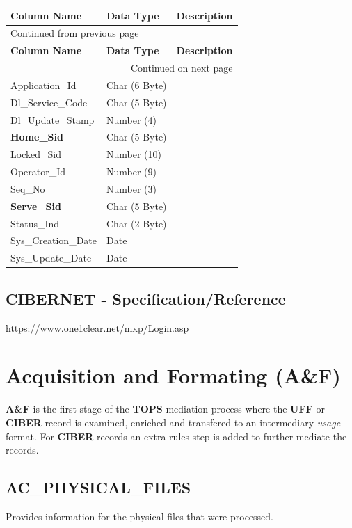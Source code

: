 \documentclass[12pt,twoside]{article}
\begin{document}
\footnotesize
\begin{longtable}{l|l|l}
\hline
\textbf{Column Name} & \textbf{Data Type} & \textbf{Description}\\
\hline
\endfirsthead
\multicolumn{3}{l}{Continued from previous page} \\
\hline

\textbf{Column Name} & \textbf{Data Type} & \textbf{Description} \\

\hline
\endhead
\hline\multicolumn{3}{r}{Continued on next page} \\
\endfoot
\endlastfoot
\hline
Application\_Id & Char (6 Byte) & \\
Dl\_Service\_Code & Char (5 Byte) & \\
Dl\_Update\_Stamp & Number (4) & \\
\textbf{Home\_Sid} & Char (5 Byte) & \\
Locked\_Sid & Number (10) & \\
Operator\_Id & Number (9) & \\
Seq\_No & Number (3) & \\
\textbf{Serve\_Sid} & Char (5 Byte) & \\
Status\_Ind & Char (2 Byte) & \\
Sys\_Creation\_Date & Date & \\
Sys\_Update\_Date & Date & \\
\hline
\end{longtable}
\normalsize
\subsection{CIBERNET - Specification/Reference}
\label{sec:orgheadline26}
\url{https://www.one1clear.net/mxp/Login.asp} 

\newpage 

\section{Acquisition and Formating (A\&F)}
\label{sec:orgheadline31}
\textbf{A\&F} is the first stage of the \textbf{TOPS} mediation process where the \textbf{UFF} or \textbf{CIBER} record is examined, enriched 
and transfered to an intermediary \emph{usage} format. For \textbf{CIBER} records an extra rules step is 
added to further mediate the records.
\subsection{AC\_PHYSICAL\_FILES}
\label{sec:orgheadline28}
Provides information for the physical files that were processed.
\footnotesize
\end{document}
